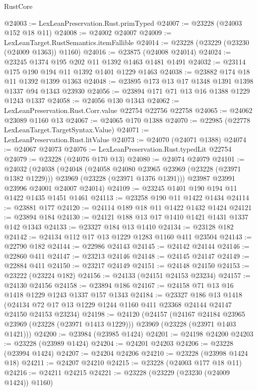 \begin{lexlean}{RustCore}
\begin{coremodule}
@24003 := LexLeanPreservation.Rust.primTyped
@24007 := @23228 (@24003 @152 @18 @11)
@24008 := @24002 @24007
@24009 := LexLeanTarget.RustSemantics.itemFallible
@24014 := @23228 (@23229 (@23230 (@24009 @1363)) @1160)
@24016 := @23875 (@24008 @24014)
@24024 := @23245 @1374 @195 @202 @11 @1392 @1463 @1481 @1491
@24032 := @23114 @175 @190 @194 @11 @1392 @1401 @1229 @1463
@24038 := @23882 @174 @18 @11 @1392 @1399 @1363
@24048 := @23895 @173 @13 @17 @1348 @1391 @1398 @1337 @94 @1343 @23930
@24056 := @23894 @171 @71 @13 @16 @1388 @1229 @1243 @1337
@24058 := @24056 @130 @1343
@24062 := LexLeanPreservation.Rust.Corr.value @22754 @22756 @22758
@24065 := @24062 @23089 @1160 @13
@24067 := @24065 @170 @1388
@24070 := @22985 (@22778 LexLeanTarget.TargetSyntax.Value)
@24071 := LexLeanPreservation.Rust.litValue
@24073 := @24070 (@24071 @1388)
@24074 := @24067 @24073
@24076 := LexLeanPreservation.Rust.typedLit @22754
@24079 := @23228 (@24076 @170 @13)
@24080 := @24074 @24079
@24101 := @24032
    (@24038
      (@24048
        (@24058 @24080 @23965 @23969 (@23228 (@23971 @1382 @1229)))
        @23969
        (@23228 (@23971 @1376 @1391)))
      @23987
      @23991
      @23996
      @24001
      @24007
      @24014)
@24109 := @23245 @1401 @190 @194 @11 @1422 @1435 @1451 @1461
@24113 := @23258 @190 @11 @1422 @1434
@24114 := @23881 @177
@24120 := @24114 @189 @18 @11 @1422 @1432 @1424
@24121 := @23894 @184
@24130 := @24121 @188 @13 @17 @1410 @1421 @1431 @1337 @142 @1343
@24133 := @23327 @184 @13 @1410
@24134 := @23128 @182
@24142 := @24134 @112 @17 @13 @1229 @1283 @1160 @411 @23504
@24143 := @22790 @182
@24144 := @22986 @24143
@24145 := @24142 @24144
@24146 := @22860 @411
@24147 := @23213 @24146
@24148 := @24145 @24147
@24149 := @22884 @411
@24150 := @23217 @24149
@24151 := @24148 @24150
@24153 := @23222 (@23224 @182)
@24156 := @24133 (@24151 @24153 @23234)
@24157 := @24130 @24156
@24158 := @23894 @186
@24167 := @24158 @71 @13 @16 @1418 @1229 @1243 @1337 @157 @1343
@24184 := @23327
    @186
    @13
    @1418
    (@24134 @72 @17 @13 @1229 @1244 @1160 @411 @23368 @24144 @24147 @24150 @24153 @23234)
@24198 := @24120
    (@24157
      (@24167 @24184 @23965 @23969 (@23228 (@23971 @1413 @1229)))
      @23969
      (@23228 (@23971 @1403 @1421)))
@24200 := @23984 (@23985 @1424)
@24201 := @24198 @24200
@24203 := @23228 (@23989 @1424)
@24204 := @24201 @24203
@24206 := @23228 (@23994 @1424)
@24207 := @24204 @24206
@24210 := @23228 (@23998 @1424 @18)
@24211 := @24207 @24210
@24215 := @23228 (@24003 @177 @18 @11)
@24216 := @24211 @24215
@24221 := @23228 (@23229 (@23230 (@24009 @1424)) @1160)

\end{coremodule}
\end{lexlean}
